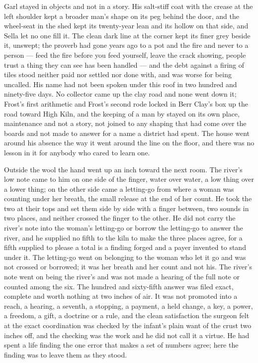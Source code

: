 Garl stayed in objects and not in a story. His salt-stiff coat with the crease at the left shoulder kept a broader man's shape on its peg behind the door, and the wheel-seat in the shed kept its twenty-year lean and its hollow on that side, and Sella let no one fill it. The clean dark line at the corner kept its finer grey beside it, unswept; the proverb had gone years ago to a pot and the fire and never to a person --- feed the fire before you feed yourself, leave the crack showing, people trust a thing they can see has been handled --- and the debt against a firing of tiles stood neither paid nor settled nor done with, and was worse for being uncalled. His name had not been spoken under this roof in two hundred and ninety-five days. No collector came up the clay road and none went down it; Frost's first arithmetic and Frost's second rode locked in Berr Clay's box up the road toward High Kiln, and the keeping of a man by  stayed on its own place, maintenance and not a story, not joined to any shaping that had come over the boards and not made to answer for a name a district had spent. The house went around his absence the way it went around the line on the floor, and there was no lesson in it for anybody who cared to learn one.

\scenebreak

Outside the wool the hand went up an inch toward the next room. The river's low note came to him on one side of the finger, water over water, a low thing over a lower thing; on the other side came a letting-go from where a woman was counting under her breath, the small release at the end of her count. He took the two at their tops and set them side by side with a finger between, two sounds in two places, and neither crossed the finger to the other. He did not carry the river's note into the woman's letting-go or borrow the letting-go to answer the river, and he supplied no fifth to the kiln to make the three places agree, for a fifth supplied to please a total is a finding forged and a payer invented to stand under it. The letting-go went on belonging to the woman who let it go and was not crossed or borrowed; it was her breath and her count and not his. The river's note went on being the river's and was not made a hearing of the full note or counted among the six. The hundred and sixty-fifth answer was filed exact, complete and worth nothing at two inches of air. It was not promoted into a reach, a hearing, a seventh, a stopping, a payment, a held change, a key, a power, a freedom, a gift, a doctrine or a rule, and the clean satisfaction the surgeon felt at the exact coordination was checked by the infant's plain want of the crust two inches off, and the checking was the work and he did not call it a virtue. He had spent a life finding the one error that makes a set of numbers agree; here the finding was to leave them as they stood.

